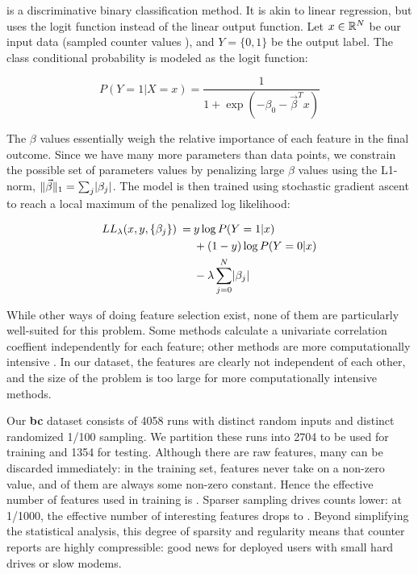   is a discriminative binary classification method.  It is akin
to linear regression, but uses the logit function instead of the
linear output function.  Let $x \in \mathbb{R}^N$ be our input data
(sampled counter values ), and $Y = \{0, 1\}$ be the
output label.  The class conditional probability is modeled as the
logit function:

\begin{equation*}
  P(Y = 1 | X = x) = \frac{1}{ 1 + \exp(- \beta_0 - \vec\beta^T x) }
\end{equation*}

The $\beta$ values essentially weigh the relative importance of each
feature in the final outcome.  Since we have many more parameters than
data points, we constrain the possible set of parameters values by
penalizing large $\beta$ values using the L1-norm, $\lVert\vec\beta\rVert_1
= \sum_j \lvert\beta_j\rvert$.  The model is then trained using stochastic
gradient ascent to reach a local maximum of the penalized log
likelihood:

\begin{equation*}
  \begin{split}
    LL_\lambda (x, y, \{\beta_j\}) \:=\:
    & y \log P(Y = 1 | x) \\
    & + (1 - y) \log P(Y = 0 | x) \\
    & - \lambda \sum_{j = 0}^N \lvert\beta_j\rvert
  \end{split}
\end{equation*}

While other ways of doing feature selection exist, none of them are
particularly well-suited for this problem.  Some methods
calculate a univariate correlation coeffient independently for each
feature; other methods are more computationally intensive
.  In our dataset, the
features are clearly not independent of each other, and the size of
the problem is too large for more computationally intensive methods.

Our \textbf{bc} dataset consists of 4058 runs with distinct random
inputs and distinct randomized 1/100 sampling.  We partition these
runs into 2704 to be used for training and 1354 for testing.  Although
there are \unknown raw features, many can be discarded immediately: in
the training set, \unknown features never take on a non-zero value,
and \unknown of them are always some non-zero constant.  Hence the
effective number of features used in training is \unknown.  Sparser
sampling drives counts lower: at 1/1000, the effective number of
interesting features drops to \unknown.  Beyond simplifying the
statistical analysis, this degree of sparsity and regularity means
that counter reports are highly compressible: good news for deployed
users with small hard drives or slow modems.

